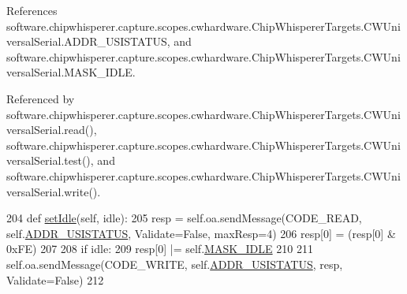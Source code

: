 References software.\+chipwhisperer.\+capture.\+scopes.\+cwhardware.\+Chip\+Whisperer\+Targets.\+C\+W\+Universal\+Serial.\+A\+D\+D\+R\+\_\+\+U\+S\+I\+S\+T\+A\+T\+U\+S, and software.\+chipwhisperer.\+capture.\+scopes.\+cwhardware.\+Chip\+Whisperer\+Targets.\+C\+W\+Universal\+Serial.\+M\+A\+S\+K\+\_\+\+I\+D\+L\+E.



Referenced by software.\+chipwhisperer.\+capture.\+scopes.\+cwhardware.\+Chip\+Whisperer\+Targets.\+C\+W\+Universal\+Serial.\+read(), software.\+chipwhisperer.\+capture.\+scopes.\+cwhardware.\+Chip\+Whisperer\+Targets.\+C\+W\+Universal\+Serial.\+test(), and software.\+chipwhisperer.\+capture.\+scopes.\+cwhardware.\+Chip\+Whisperer\+Targets.\+C\+W\+Universal\+Serial.\+write().


\begin{DoxyCode}
204     \textcolor{keyword}{def }\hyperlink{classsoftware_1_1chipwhisperer_1_1capture_1_1scopes_1_1cwhardware_1_1ChipWhispererTargets_1_1CWUniversalSerial_a72b160bf1f232482538124fefd04de79}{setIdle}(self, idle):
205         resp = self.oa.sendMessage(CODE\_READ, self.\hyperlink{classsoftware_1_1chipwhisperer_1_1capture_1_1scopes_1_1cwhardware_1_1ChipWhispererTargets_1_1CWUniversalSerial_a6365eef9c1c87b5cf93d078ed43a1872}{ADDR\_USISTATUS}, Validate=\textcolor{keyword}{False}, maxResp=4)
206         resp[0] = (resp[0] & 0xFE)
207          
208         \textcolor{keywordflow}{if} idle:
209             resp[0] |= self.\hyperlink{classsoftware_1_1chipwhisperer_1_1capture_1_1scopes_1_1cwhardware_1_1ChipWhispererTargets_1_1CWUniversalSerial_a5478d4af915910a6ddfd68564935eb12}{MASK\_IDLE}
210             
211         self.oa.sendMessage(CODE\_WRITE, self.\hyperlink{classsoftware_1_1chipwhisperer_1_1capture_1_1scopes_1_1cwhardware_1_1ChipWhispererTargets_1_1CWUniversalSerial_a6365eef9c1c87b5cf93d078ed43a1872}{ADDR\_USISTATUS}, resp, Validate=\textcolor{keyword}{False})
212         
\end{DoxyCode}
\hypertarget{classsoftware_1_1chipwhisperer_1_1capture_1_1scopes_1_1cwhardware_1_1ChipWhispererTargets_1_1CWUniversalSerial_aa4d9b51fa5b08492f006c0a36255bb4d}{}
